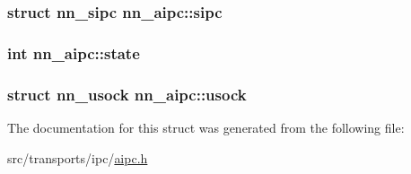 \subsubsection[{sipc}]{\setlength{\rightskip}{0pt plus 5cm}struct {\bf nn\+\_\+sipc} nn\+\_\+aipc\+::sipc}\hypertarget{structnn__aipc_a8fd7cacc4fd9dd917bb28b5531bea6d1}{}\label{structnn__aipc_a8fd7cacc4fd9dd917bb28b5531bea6d1}
\subsubsection[{state}]{\setlength{\rightskip}{0pt plus 5cm}int nn\+\_\+aipc\+::state}\hypertarget{structnn__aipc_a3aa1ceafa1bf2916f05b26bee723762d}{}\label{structnn__aipc_a3aa1ceafa1bf2916f05b26bee723762d}
\subsubsection[{usock}]{\setlength{\rightskip}{0pt plus 5cm}struct {\bf nn\+\_\+usock} nn\+\_\+aipc\+::usock}\hypertarget{structnn__aipc_a9d3cd8149c6dac1c9f7987fd55325dcd}{}\label{structnn__aipc_a9d3cd8149c6dac1c9f7987fd55325dcd}


The documentation for this struct was generated from the following file\+:\begin{DoxyCompactItemize}
\item 
src/transports/ipc/\hyperlink{aipc_8h}{aipc.\+h}\end{DoxyCompactItemize}
